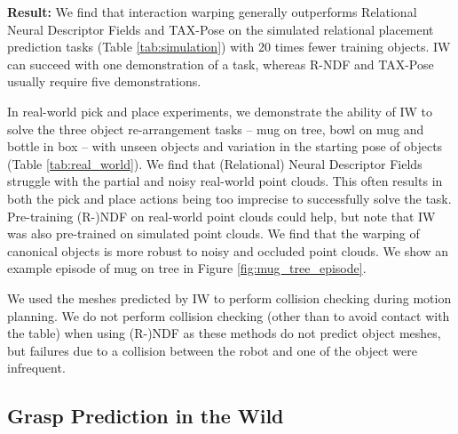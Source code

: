 \documentclass{article}
\newcommand{\ob}[1]{\textcolor{purple}{[\textbf{OB:} #1]}}
\begin{document}
\textbf{Result:} We find that interaction warping generally outperforms Relational Neural Descriptor Fields \cite{simeonov2022neural} and TAX-Pose \cite{pan22taxpose} on the simulated relational placement prediction tasks (Table \ref{tab:simulation}) with 20 times fewer training objects. IW can succeed with one demonstration of a task, whereas R-NDF and TAX-Pose usually require five demonstrations. 

In real-world pick and place experiments, we demonstrate the ability of IW to solve the three object re-arrangement tasks -- mug on tree, bowl on mug and bottle in box -- with unseen objects and variation in the starting pose of objects (Table \ref{tab:real_world}). We find that (Relational) Neural Descriptor Fields \cite{simeonov22neural,simeonov22se} struggle with the partial and noisy real-world point clouds. This often results in both the pick and place actions being too imprecise to successfully solve the task. Pre-training (R-)NDF on real-world point clouds could help, but note that IW was also pre-trained on simulated point clouds. We find that the warping of canonical objects is more robust to noisy and occluded point clouds. We show an example episode of mug on tree in Figure \ref{fig:mug_tree_episode}.

We used the meshes predicted by IW to perform collision checking during motion planning. We do not perform collision checking (other than to avoid contact with the table) when using (R-)NDF as these methods do not predict object meshes, but failures due to a collision between the robot and one of the object were infrequent.


\subsection{Grasp Prediction in the Wild}
\label{sec:exp:wild}
\end{document}
